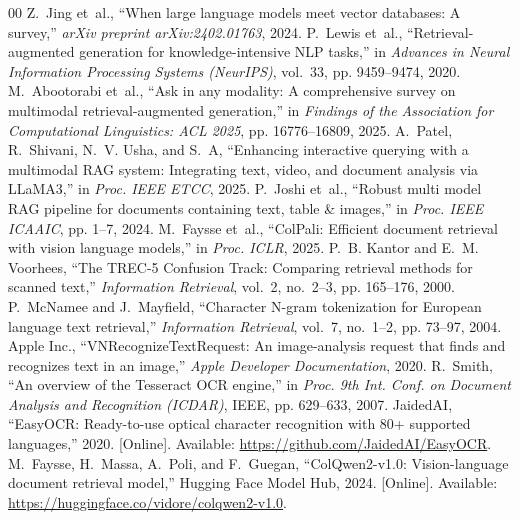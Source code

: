 {}

\def\IEEEbibitemsep{-0.8pt plus 0.2pt minus 0.1pt}
\begin{thebibliography}{00}
\scriptsize
\setlength{\itemsep}{0pt}
\setlength{\parskip}{0pt}
\setlength{\parsep}{0pt}
Z.~Jing et~al., ``When large language models meet vector databases: A survey,'' \emph{arXiv preprint arXiv:2402.01763}, 2024.
P.~Lewis et~al., ``Retrieval-augmented generation for knowledge-intensive NLP tasks,'' in \emph{Advances in Neural Information Processing Systems (NeurIPS)}, vol.~33, pp. 9459--9474, 2020.
M.~Abootorabi et~al., ``Ask in any modality: A comprehensive survey on multimodal retrieval-augmented generation,'' in \emph{Findings of the Association for Computational Linguistics: ACL 2025}, pp. 16776--16809, 2025.
A.~Patel, R.~Shivani, N.~V. Usha, and S.~A, ``Enhancing interactive querying with a multimodal RAG system: Integrating text, video, and document analysis via LLaMA3,'' in \emph{Proc. IEEE ETCC}, 2025.
P.~Joshi et~al., ``Robust multi model RAG pipeline for documents containing text, table \& images,'' in \emph{Proc. IEEE ICAAIC}, pp. 1--7, 2024.
M.~Faysse et~al., ``ColPali: Efficient document retrieval with vision language models,'' in \emph{Proc. ICLR}, 2025.
P.~B. Kantor and E.~M. Voorhees, ``The TREC-5 Confusion Track: Comparing retrieval methods for scanned text,'' \emph{Information Retrieval}, vol.~2, no.~2--3, pp. 165--176, 2000.
P.~McNamee and J.~Mayfield, ``Character N-gram tokenization for European language text retrieval,'' \emph{Information Retrieval}, vol.~7, no.~1--2, pp. 73--97, 2004.
Apple Inc., ``VNRecognizeTextRequest: An image-analysis request that finds and recognizes text in an image,'' \emph{Apple Developer Documentation}, 2020.
R.~Smith, ``An overview of the Tesseract OCR engine,'' in \emph{Proc. 9th Int. Conf. on Document Analysis and Recognition (ICDAR)}, IEEE, pp. 629--633, 2007.
JaidedAI, ``EasyOCR: Ready-to-use optical character recognition with 80+ supported languages,'' 2020. [Online]. Available: \url{https://github.com/JaidedAI/EasyOCR}.
M.~Faysse, H.~Massa, A.~Poli, and F.~Guegan, ``ColQwen2-v1.0: Vision-language document retrieval model,'' Hugging Face Model Hub, 2024. [Online]. Available: \url{https://huggingface.co/vidore/colqwen2-v1.0}.

\end{thebibliography}
